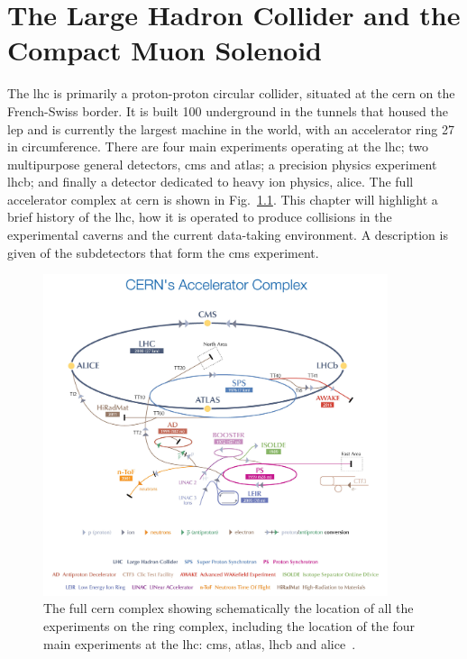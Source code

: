 \chapter{The Large Hadron Collider and the Compact Muon Solenoid}
\label{ch:LHCCMS}

The \acrshort{lhc} is primarily a proton-proton circular collider, situated at the \acrfull{cern} on the French-Swiss border. 
It is built 100\m{} underground in the tunnels that housed the \acrfull{lep} and is currently the largest machine in the world, with an accelerator ring 27\km{} in circumference. 
There are four main experiments operating at the \acrshort{lhc}; two multipurpose general detectors, \acrshort{cms} and \acrshort{atlas}; a precision \bquark{} physics experiment \acrshort{lhcb}; and finally a detector dedicated to heavy ion physics, \acrfull{alice}. 
The full accelerator complex at \acrshort{cern} is shown in Fig.~\ref{fig:CERNcomplex}.
This chapter will highlight a brief history of the \acrshort{lhc}, how it is operated to produce collisions in the experimental caverns and the current data-taking environment.
A description is given of the subdetectors that form the \acrshort{cms} experiment.
\begin{figure}[htpb]
	\centering
	\includegraphics[width=0.9\textwidth]{Figures/CERNcomplex}
	\caption[The full \acrshort{cern} complex showing schematically the location of all the experiments on the ring complex, including the location of the four main experiments at the \acrshort{lhc}: \acrshort{cms}, \acrshort{atlas}, \acrshort{lhcb} and \acrshort{alice}.]{The full \acrshort{cern} complex showing schematically the location of all the experiments on the ring complex, including the location of the four main experiments at the \acrshort{lhc}: \acrshort{cms}, \acrshort{atlas}, \acrshort{lhcb} and \acrshort{alice}~\cite{CERNcomplex}. }
	\label{fig:CERNcomplex}
\end{figure}

